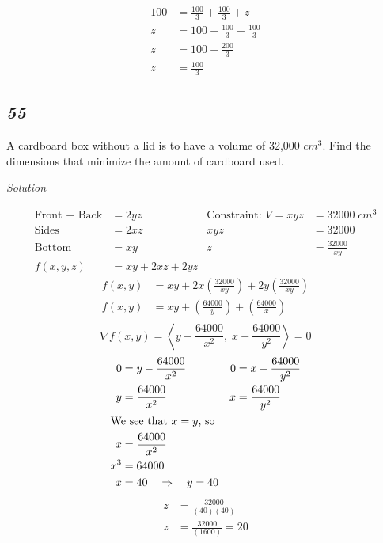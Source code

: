 \documentclass{article}
\newcommand\vv[1]{\left\langle #1 \right\rangle}
\newcommand\rr{\quad\Rightarrow\quad}
\newcommand{\solution}{\centerline{\textit{Solution}}}
\newcommand{\bp}[1]{\left(#1\right)}
\begin{document}
{{{{{{{{{{{{\begin{align*}
\end{align*}
\begin{align*}
    100 &= \frac {100} 3 + \frac {100} 3 + z \\
    z &= 100 - \frac {100} 3 - \frac {100} 3 \\
    z &= 100 - \frac {200} 3 \\
    z &= \frac {100} 3 
\end{align*}
\begin{center}
    \subsection*{\textit{55}} 
\end{center}
A cardboard box without a lid is to have a volume of 32,000 $cm^3$. Find the
dimensions that minimize the amount of cardboard used. \\
\solution
\vspace{1em}
\begin{align*}
    \text{Front + Back} &= 2yz & \text{Constraint: } V = xyz &= 32000\;cm^3 \\
    \text{Sides} &= 2xz &  xyz &= 32000 \\
    \text{Bottom} &= xy & z &= \frac{32000}{xy}\\
    f(x,y,z) &= xy + 2xz + 2yz
\end{align*}
\begin{align*}
    f(x,y) &= xy + 2x\bp{\frac{32000}{xy}} + 2y\bp{\frac{32000}{xy}} \\
    f(x,y) &= xy + \bp{\frac{64000}{y}} + \bp{\frac{64000}{x}} \\
\end{align*}
\[
\nabla f(x,y) = \vv{y-\frac{64000}{x^2},\;x-\frac{64000}{y^2}} = 0
\]
\begin{align*}
    0 &= y-\frac{64000}{x^2} & 0 &= x-\frac{64000}{y^2} \\
    y &= \frac{64000}{x^2} & x &= \frac{64000}{y^2} \\
    \intertext{We see that $x=y$, so}
    x &= \frac{64000}{x^2} \\
    x^3 &= 64000 \\
    x &= 40 \rr y = 40
\end{align*}
\begin{align*}
    z &= \frac{32000}{(40)(40)} \\
    z &= \frac{32000}{(1600)} = 20
\end{align*}
\newpage
\begin{center}

\end{center}}}}}}}}}}}}}
\end{document}
